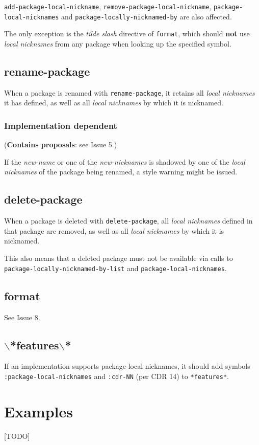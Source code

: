 \documentclass[11pt]{article}
\begin{document}
\texttt{add-package-local-nickname}, \texttt{remove-package-local-nickname},
\texttt{package-local-nicknames} and \texttt{package-locally-nicknamed-by} are also affected.

The only exception is the \emph{tilde slash} directive of \texttt{format}, which should \textbf{not}
use \emph{local nicknames} from any package when looking up the specified symbol.
\subsection{rename-package}
\label{sec:orga809406}
When a package is renamed with \texttt{rename-package}, it retains all \emph{local nicknames}
it has defined, as well as all \emph{local nicknames} by which it is nicknamed.

\subsubsection{Implementation dependent}
\label{sec:orge5d4e8b}
(\textbf{Contains proposals}: see Issue 5.)

If the \emph{new-name} or one of the \emph{new-nicknames} is shadowed by one of the \emph{local
nicknames} of the package being renamed, a style warning might be issued.
\subsection{delete-package}
\label{sec:org670a32e}
When a package is deleted with \texttt{delete-package}, all \emph{local nicknames} defined in
that package are removed, as well as all \emph{local nicknames} by which it is
nicknamed.

This also means that a deleted package must not be available via calls to
\texttt{package-locally-nicknamed-by-list} and \texttt{package-local-nicknames}.
\subsection{format}
\label{sec:orgfcde85d}
See Issue 8.
\subsection{$\backslash$*features$\backslash$*}
\label{sec:org14e8394}
If an implementation supports package-local nicknames, it should add symbols
\texttt{:package-local-nicknames} and \texttt{:cdr-NN} (per CDR 14) to \texttt{*features*}.
\section{Examples}
\label{sec:org2022a71}
[TODO]
\end{document}
